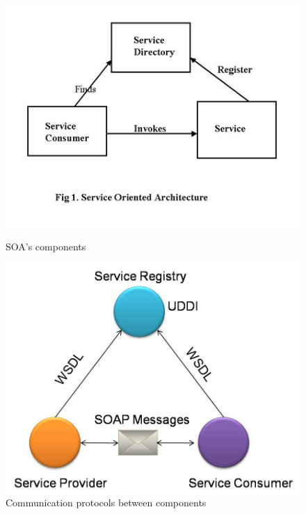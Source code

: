 \documentclass[12pt]{article}
\begin{document}
\begin{figure}[here!]
\centering
\begin{minipage}[h]{0.4\textwidth}
\centering
    \includegraphics[width=1.0\textwidth]{images/arg3}
    \caption{SOA's components \cite{arg3}}
    \label{fig:servicetri}
\end{minipage}
\begin{minipage}[h]{0.19\textwidth}
\vfill
\end{minipage}
\begin{minipage}[h]{0.4\textwidth}
\centering
    \includegraphics[width=1.0\textwidth]{images/arg1}
    \caption{Communication protocols between components \cite{arg1}}
    \label{fig:comtri}
\end{minipage}
\end{figure}
\FloatBarrier
\end{document}
